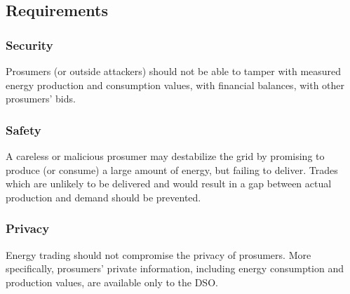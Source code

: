 \subsection{Requirements}

\subsubsection{Security}
Prosumers (or outside attackers) should not be able to tamper with measured energy production and consumption values, with financial balances, with other prosumers' bids.

\subsubsection{Safety}
A careless or malicious prosumer may destabilize the grid by promising to produce (or consume) a large amount of energy, but failing to deliver.
Trades which are unlikely to be delivered and would result in a gap between actual production and demand should be prevented.

\subsubsection{Privacy} 
Energy trading should not compromise the privacy of prosumers.
More specifically, prosumers' private information, including energy consumption and production values, are available only to the DSO.

